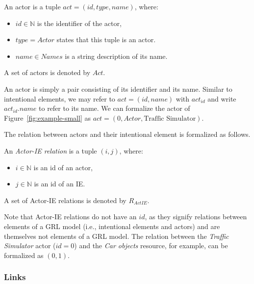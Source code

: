 \begin{definition}[Actor]
\label{def:actor}
An actor is a tuple $act=(id,type, name)$, where:
\begin{itemize}
\item $id\in\mathbb{N}$ is the identifier of the actor, 
\item $type = Actor$ states that this tuple is an actor.
\item $name\in Names$ is a string description of its name.
\end{itemize}
A set of actors is denoted by $Act$.
\end{definition}
An actor is simply a pair consisting of its identifier and its name. Similar to intentional elements, we may refer to $act = (id,name)$ with $act_{id}$ and write $act_{id}.name$ to refer to its name. We can formalize the actor of Figure~\ref{fig:example-small} as $act=(0,Actor,\text{Traffic Simulator})$.%

The relation between actors and their intentional element is formalized as follows. 

\begin{definition}
\label{def:act-ie-relation}
An \emph{Actor-IE relation} is a tuple $(i, j)$, where:
\begin{itemize}
\item $i\in\mathbb{N}$ is an id of an actor,
\item $j\in\mathbb{N}$ is an id of an IE.
\end{itemize}

A set of Actor-IE relations is denoted by $R_{ActIE}$.
\end{definition}

Note that Actor-IE relations do not have an $id$, as they signify relations between elements of a GRL model (i.e., intentional elements and actors) and are themselves not elements of a GRL model. The relation between the \emph{Traffic Simulator} actor ($id = 0$) and the \emph{Car objects} resource, for example, can be formalized as $(0, 1)$.

\subsubsection{Links}

